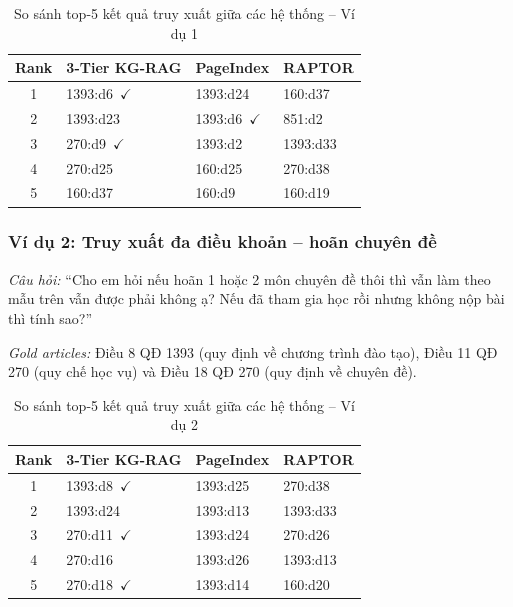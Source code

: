 \begin{table}[htbp]
  \centering
  \caption{So sánh top-5 kết quả truy xuất giữa các hệ thống -- Ví dụ 1}
  \label{tab:ex1}
  \begin{tabular}{clll}
    \toprule
    \textbf{Rank} & \textbf{3-Tier KG-RAG} & \textbf{PageIndex} & \textbf{RAPTOR} \\
    \midrule
    1 & 1393:d6~$\checkmark$  & 1393:d24           & 160:d37  \\
    2 & 1393:d23            & 1393:d6~$\checkmark$ & 851:d2   \\
    3 & 270:d9~$\checkmark$   & 1393:d2            & 1393:d33 \\
    4 & 270:d25             & 160:d25            & 270:d38  \\
    5 & 160:d37             & 160:d9             & 160:d19  \\
    \bottomrule
  \end{tabular}
\end{table}

\subsubsection*{Ví dụ 2: Truy xuất đa điều khoản -- hoãn chuyên đề}

\textit{Câu hỏi:} ``Cho em hỏi nếu hoãn 1 hoặc 2 môn chuyên đề thôi thì vẫn làm theo mẫu
trên vẫn được phải không ạ? Nếu đã tham gia học rồi nhưng không nộp bài thì tính
sao?''

\textit{Gold articles:} Điều 8 QĐ 1393 (quy định về chương trình đào tạo), Điều 11 QĐ 270
(quy chế học vụ) và Điều 18 QĐ 270 (quy định về chuyên đề).

\begin{table}[htbp]
  \centering
  \caption{So sánh top-5 kết quả truy xuất giữa các hệ thống -- Ví dụ 2}
  \label{tab:ex2}
  \begin{tabular}{clll}
    \toprule
    \textbf{Rank} & \textbf{3-Tier KG-RAG} & \textbf{PageIndex} & \textbf{RAPTOR} \\
    \midrule
    1 & 1393:d8~$\checkmark$  & 1393:d25  & 270:d38  \\
    2 & 1393:d24            & 1393:d13  & 1393:d33 \\
    3 & 270:d11~$\checkmark$  & 1393:d24  & 270:d26  \\
    4 & 270:d16             & 1393:d26  & 1393:d13 \\
    5 & 270:d18~$\checkmark$  & 1393:d14  & 160:d20  \\
    \bottomrule
  \end{tabular}
\end{table}

